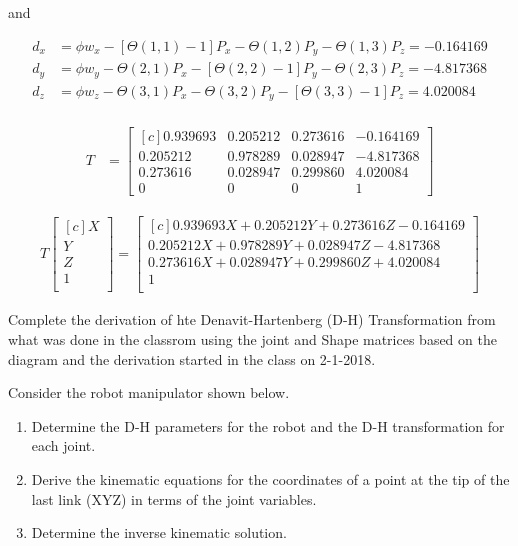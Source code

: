 \documentclass[onecolumn,10pt]{jhwhw}
\begin{document}
and

\begin{align*}
d_x &= \phi w_x - [\Theta \left (1, 1 \right) - 1] P_x - \Theta \left ( 1, 2 \right ) P_y - \Theta \left ( 1, 3 \right ) P_z = -0.164169 \\
d_y &= \phi w_y - \Theta \left (2, 1 \right) P_x - [\Theta \left ( 2, 2 \right ) - 1] P_y - \Theta \left ( 2, 3 \right ) P_z = -4.817368 \\
d_z &= \phi w_z - \Theta \left (3, 1 \right) P_x - \Theta \left ( 3, 2 \right ) P_y - [\Theta \left ( 3, 3 \right ) - 1] P_z =  4.020084 \\
\end{align*}

\begin{align*}
T &=
\begin{bmatrix*}[c]
0.939693 & 0.205212 & 0.273616 & -0.164169 \\
0.205212 & 0.978289 & 0.028947 & -4.817368 \\
0.273616 & 0.028947 & 0.299860 &  4.020084 \\
0 & 0 & 0 & 1
\end{bmatrix*}
\end{align*}

\begin{align*}
T
\begin{bmatrix*}[c]
X \\
Y \\
Z \\
1 \\
\end{bmatrix*}
=
\begin{bmatrix*}[c]
0.939693 X + 0.205212 Y + 0.273616 Z - 0.164169 \\
0.205212 X + 0.978289 Y + 0.028947 Z - 4.817368 \\
0.273616 X + 0.028947 Y + 0.299860 Z + 4.020084 \\
                                              1 \\
\end{bmatrix*}
\end{align*}



\problem{}
Complete the derivation of hte Denavit-Hartenberg (D-H) Transformation from what was done in the classrom using the joint and Shape matrices based on the diagram and the derivation started in the class on 2-1-2018.

\problem{}
Consider the robot manipulator shown below.
\begin{enumerate}
    \item Determine the D-H parameters for the robot and the D-H transformation for each joint.
    \item Derive the kinematic equations for the coordinates of a point at the tip of the last link (XYZ) in terms of the joint variables.
    \item Determine the inverse kinematic solution.
\end{enumerate}
\end{document}
